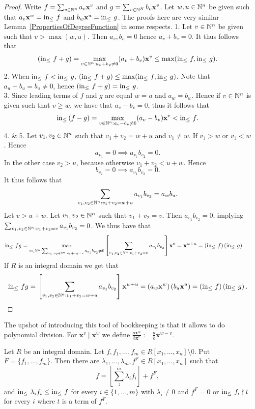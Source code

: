 \begin{proof}
    Write $f=\sum_{v\in\mathbb{N}^n} a_v\mathbf{x}^v$ and $g=\sum_{v\in \mathbb{N}^N} b_v\mathbf{x}^v$. Let $w,u\in \mathbb{N}^n$ be given such that $a_v\mathbf{x}^w = \mathrm{in}_\leq\ f$ and $b_w\mathbf{x}^u = \mathrm{in}_\leq\ g$. The proofs here are very similar Lemma~\ref{PropertiesOfDegreeFunction} in some respects.
    1. Let $v\in \mathbb{N}^n$ be given such that $v>\max(w,u)$. Then $a_v,b_v=0$ hence $a_v+b_v=0$. It thus follows that 
    $$\left(\mathrm{in}_\leq\ f+g\right) = \max_{v\in \mathbb{N}^n : a_v+b_v \neq 0} (a_v+b_v)\mathbf{x}^v \leq \max(\mathrm{in}_\leq\ f,\mathrm{in}_\leq\ g).$$
    2. When $\inn\ f < \inn\ g$, $\left(\inn\ f+g\right) \leq \max(\inn\ f,\inn\ g)$. Note that $a_u+b_u = b_u\neq 0$, hence $\left(\inn\ f + g\right) = \inn\ g$.\\
    3. Since leading terms of $f$ and $g$ are equal $w=u$ and $a_w = b_w$. Hence if $v\in \mathbb{N}^n$ is given such that $v\geq w$, we have that $a_v-b_v = 0$, thus it follows that 
    $$\inn\left(f-g\right) = \max_{v\in \N^n : a_v-b_v\neq 0} (a_v-b_v)\mathbf{x}^v< \inn\ f.$$
    4. \& 5.
    Let $v_1,v_2\in \mathbb{N}^n$ such that $v_1+v_2 = w+u $ and $v_1\neq w$. If $v_1>w$ or $v_1<w$. Hence 
    $$a_{v_1}=0\implies a_{v_1}b_{v_2}=0.$$
    In the other case $v_2>u$, because otherwise $v_1+v_2<u+w$. Hence $$b_{v_2}=0 \implies a_{v_1}b_{v_2}=0.$$
    It thus follows that 
    $$\sum_{v_1,v_2\in\mathbb{N}^n : v_1+v_2 = w+u} a_{v_1}b_{v_2}= a_wb_u.$$
    Let $v > u+w$. Let $v_1,v_2\in \mathbb{N}^n$ such that $v_1+v_2 = v$. Then $a_{v_1}b_{v_2} = 0$, implying $\sum_{v_1,v_2\in \mathbb{N}^n : v_1+v_2=v} a_{v_1}b_{v_2} = 0$. We thus have that 
    \begin{align*} 
        \inn\ fg &= \max_{v\in\N^n : \sum_{v_1,v_2\in\N^n : v_1+v_2=v} a_{v_1}b_{v_2}\neq 0} \left[\sum_{v_1,v_2\in \N^n : v_1+v_2 = v}a_{v_1}b_{v_2}\right]\mathbf{x}^v = \mathbf{x}^{w+u}=\left(\inn\ f\right) \left(\inn\ g\right).
    \end{align*}
    If $R$ is an integral domain we get that 
    $$\inn\ fg = \left[\sum_{v_1,v_2\in \N^n : v_1+v_2=w+u} a_{v_1}b_{v_2}\right]\mathbf{x}^{w+u} = \left(a_w\mathbf{x}^w\right)\left(b_u\mathbf{x}^u\right) =  \left(\inn\ f \right)\left( \inn\ g\right).$$
\end{proof}
The upshot of introducing this tool of bookkeeping is that it allows to do polynomial division. For $\mathbf{x}^v\mid \mathbf{x}^w$ we define $\frac{a\mathbf{x}^w}{b\mathbf{x}^v} := \frac{a}{b}\mathbf{x}^{w-v}$.
\begin{theorem}
    Let $R$ be an integral domain. Let $f,f_1,\dots,f_m\in R[x_1,\dots,x_n]\setminus 0$. Put $F= \{f_1,\dots,f_m\}$. Then there are $\lambda_1,\dots,\lambda_m, f^F\in R[x_1,\dots,x_n]$ such that 
    $$f = \left[\sum_1^m \lambda_if_i\right]+f^F,$$
    and $\mathrm{in}_\leq\ \lambda_if_i\leq \mathrm{in}_\leq\ f$ for every $i\in\{1,\dots,m\}$ with $\lambda_i\neq 0$ and $f^F = 0$ or $\mathrm{in}_\leq \ f_i\nmid t$ for every $i$ where $t$ is a term of $f^F$.
\end{theorem}
